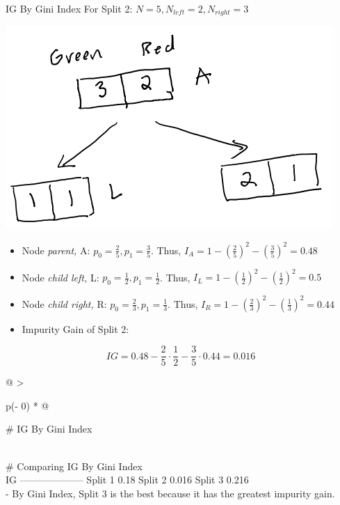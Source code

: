 \documentclass[
  ignorenonframetext,
]{beamer}
\begin{document}
\begin{frame}{IG By Gini Index}
\protect\hypertarget{ig-by-gini-index}{}
For Split 2: \(N = 5, N_{left} =2, N_{right} = 3\)

\includegraphics{images/im3.png}

\begin{itemize}
\item
  Node \emph{parent,} A: \(p_0 = \frac{2}{5}, p_1 = \frac{3}{5}\). Thus,
  \(I_{A} = 1-(\frac{2}{5})^2- (\frac{3}{5})^2 = 0.48\)
\item
  Node \emph{child left,} L: \(p_0 = \frac{1}{2}, p_1 = \frac{1}{2}\).
  Thus, \(I_{L} = 1- (\frac{1}{2})^2-(\frac{1}{2})^2=0.5\)
\item
  Node \emph{child right,} R: \(p_0 = \frac{2}{3}, p_1 = \frac{1}{3}\).
  Thus, \(I_{R} = 1-(\frac{2}{3})^2 -(\frac{1}{3})^2 = 0.44\)
\item
  Impurity Gain of Split 2:
\end{itemize}

\[IG = 0.48 - \frac{2}{5} \cdot \frac{1}{2}-\frac{3}{5} \cdot 0.44 = 0.016\]

\begin{longtable}[]{@{}
  >{\raggedright\arraybackslash}p{(\columnwidth - 0\tabcolsep) * }@{}}
\toprule
\begin{minipage}[b]{\linewidth}\raggedright
\# IG By Gini Index
\end{minipage} \\
\midrule
\endhead
\# Comparing IG By Gini Index \\
\textbar{} \textbar{} IG \textbar{}
\textbar---------\textbar-----------\textbar{} \textbar{} Split 1
\textbar{} 0.18 \textbar{} \textbar{} Split 2 \textbar{} 0.016
\textbar{} \textbar{} Split 3 \textbar{} 0.216 \textbar{} \\
- By Gini Index, Split 3 is the best because it has the greatest
impurity gain. \\
\bottomrule
\end{longtable}
\end{frame}
\end{document}
